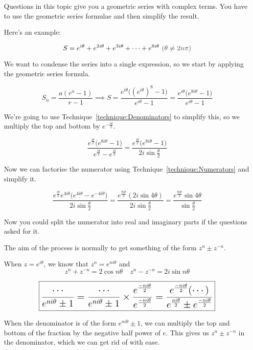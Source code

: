\documentclass[../main.tex]{subfile}
\begin{document}

Questions in this topic give you a geometric series with complex terms. You have to use the geometric series formulae and then simplify the result.

Here's an example:

$$S = e^{i\theta} + e^{2i\theta} + e^{3i\theta} + \cdots + e^{8i\theta}\ \constraint{\theta \ne 2n\pi}$$

We want to condense the series into a single expression, so we start by applying the geometric series formula.

$$S_n = \dfrac{a(r^n - 1)}{r - 1}
\implies S = \frac{e^{i\theta} \big( (e^{i\theta})^8 - 1 \big)}{e^{i\theta} - 1}
= \frac{e^{i\theta} \big( e^{8i\theta} - 1 \big)}{e^{i\theta} - 1}$$

We're going to use Technique~\ref{technique:Denominators} to simplify this, so we multiply the top and bottom by $\displaystyle e^{-\frac{i\theta}{2}}$.

$$\frac{e^{\frac{i\theta}{2}} \big(e^{8i\theta} - 1\big)}{e^{\frac{i\theta}{2}} - e^{\frac{i\theta}{2}}}
= \frac{e^{\frac{i\theta}{2}} \big(e^{8i\theta} - 1\big)}{2i\sin \frac{\theta}{2}}$$

Now we can factorise the numerator using Technique~\ref{technique:Numerators} and simplify it.

$$\frac{e^{\frac{i\theta}{2}} e^{4i\theta} \big(e^{4i\theta} - e^{-4i\theta}\big)}{2i\sin \frac{\theta}{2}}
= \frac{e^{\frac{9i\theta}{2}} (2i\sin 4\theta)}{2i\sin \frac{\theta}{2}}
= \frac{e^{\frac{9i\theta}{2}} \sin 4\theta}{\sin \frac{\theta}{2}}$$

Now you could split the numerator into real and imaginary parts if the questions asked for it.


The aim of the process is normally to get something of the form $z^n \pm z^{-n}$.

When $z = e^{i\theta}$, we know that $z^n = e^{ni\theta}$ and $$\boxed{z^n + z^{-n} = 2\cos n\theta}\ \ \ \ \ \boxed{z^n - z^{-n} = 2i\sin n\theta}$$


$$\Large \boxed{\frac{\cdots}{e^{ni\theta} \pm 1}
= \frac{\cdots}{e^{ni\theta} \pm 1} \times \frac{e^\frac{-ni\theta}{2}}{e^\frac{-ni\theta}{2}}
= \frac{e^\frac{-ni\theta}{2} (\cdots)}{e^\frac{ni\theta}{2} \pm e^\frac{-ni\theta}{2}}}$$

When the denominator is of the form $\displaystyle e^{ni\theta} \pm 1$, we can multiply the top and bottom of the fraction by the negative half power of $e$. This gives us $z^n \pm z^{-n}$ in the denominator, which we can get rid of with ease.
\end{document}
